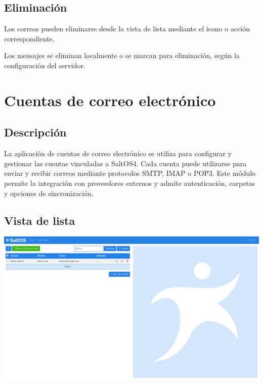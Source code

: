 \documentclass[a4paper]{article}
\begin{document}
\hypertarget{toc95}{}
\subsection{Eliminación}

Los correos pueden eliminarse desde la vista de lista mediante el icono o acción correspondiente.

Los mensajes se eliminan localmente o se marcan para eliminación, según la configuración del servidor.


\hypertarget{toc96}{}
\section{Cuentas de correo electrónico}

\hypertarget{toc97}{}
\subsection{Descripción}

La aplicación de cuentas de correo electrónico se utiliza para configurar y gestionar las cuentas vinculadas a SaltOS4.
Cada cuenta puede utilizarse para enviar y recibir correos mediante protocolos SMTP, IMAP o POP3.
Este módulo permite la integración con proveedores externos y admite autenticación, carpetas y opciones de sincronización.

\hypertarget{toc98}{}
\subsection{Vista de lista}

\begin{center}\includegraphics[width=1\textwidth]{../ujest/snaps/test-screenshots-js-screenshots-emails-emails-accounts-list-es-es-1-snap.png}\end{center}
\end{document}
